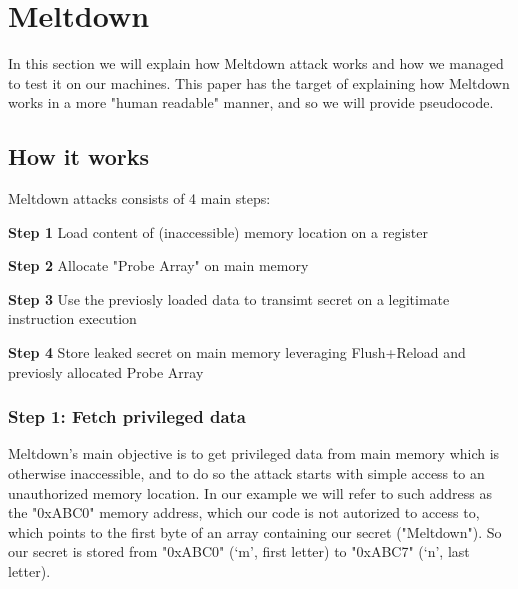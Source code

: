 \section{Meltdown}
In this section we will explain how Meltdown attack works and how we managed to
test it on our machines. This paper has the target of explaining how Meltdown works in a more "human readable" manner, and so we will provide pseudocode.

\subsection{How it works}
Meltdown attacks consists of 4 main steps:

\textbf{Step 1} Load content of (inaccessible) memory location on a register

\textbf{Step 2} Allocate "Probe Array" on main memory

\textbf{Step 3} Use the previosly loaded data to transimt secret on a legitimate instruction execution

\textbf{Step 4} Store leaked secret on main memory leveraging Flush+Reload and previosly allocated Probe Array

\subsubsection{Step 1: Fetch privileged data}
Meltdown's main objective is to get privileged data from main memory which is otherwise inaccessible, and to do so
the attack starts with simple access to an unauthorized memory location.
In our example we will refer to such address as the "0xABC0" memory address, which our code is not autorized to access to,
which points to the first byte of an array containing our secret ("Meltdown").
So our secret is stored from "0xABC0" (`m', first letter) to "0xABC7" (`n', last letter).

